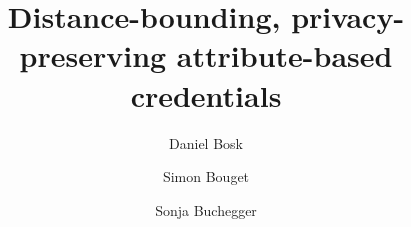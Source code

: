 \documentclass[USenglish]{llncs}
\begin{document}
\author{%
  Daniel Bosk \and
  Simon Bouget \and
  Sonja Buchegger%
}

\title{%
  Distance-bounding, privacy-preserving attribute-based credentials
}


\end{document}
